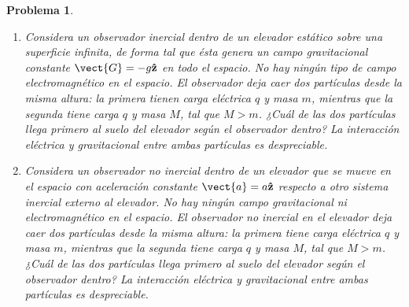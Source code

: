 \documentclass[12pt]{article}
\theoremstyle{break}
\newtheorem{exercise}{Problema}
\theoremstyle{nonumberbreak}
\DeclareRobustCommand{\uvec}[1]{{%
  \ifcsname uvec#1\endcsname
     \csname uvec#1\endcsname
   \else
    \bm{\hat{\mathbf{#1}}}%
   \fi
}}%
\begin{document}
\begin{exercise}
\begin{enumerate}[label = \alph*)]
            \begin{align*}
                ma_{1} &= Ma_{2},\\
                \dfrac{a_{1}}{a_{2}} &= \dfrac{M}{m}.
            \end{align*}

            Por hipótesis sabemos que \(M > m\), entonces

            \begin{align*}
                \dfrac{a_{1}}{a_{2}} &> 1,\\
                \Rightarrow a_{1} &> a_{2}. 
            \end{align*}

            Por lo tanto, la partícula con masa \(m\) llega primero al suelo del elevador.

            \item Considera un observador inercial dentro de un elevador estático sobre una superficie infinita, de forma tal que ésta genera un campo gravitacional constante \(\vect{G} = -g\uvec{z}\) en todo el espacio. No hay ningún tipo de campo electromagnético en el espacio. El observador deja caer dos partículas desde la misma altura: la primera tienen carga eléctrica \(q\) y masa \(m\), mientras que la segunda tiene carga \(q\) y masa \(M\), tal que \(M > m\). ¿Cuál de las dos partículas llega primero al suelo del elevador según el observador dentro? La interacción eléctrica y gravitacional entre ambas partículas es despreciable.
            \item Considera un observador no inercial dentro de un elevador que se mueve en el espacio con aceleración constante \(\vect{a} = a\uvec{z}\) respecto a otro sistema inercial externo al elevador. No hay ningún campo gravitacional ni electromagnético en el espacio. El observador no inercial en el elevador deja caer dos partículas desde la misma altura: la primera tiene carga eléctrica \(q\) y masa \(m\), mientras que la segunda tiene carga \(q\) y masa \(M\), tal que \(M > m\). ¿Cuál de las dos partículas llega primero al suelo del elevador según el observador dentro? La interacción eléctrica y gravitacional entre ambas partículas es despreciable.
        \end{enumerate}
    \end{exercise}
\end{document}
